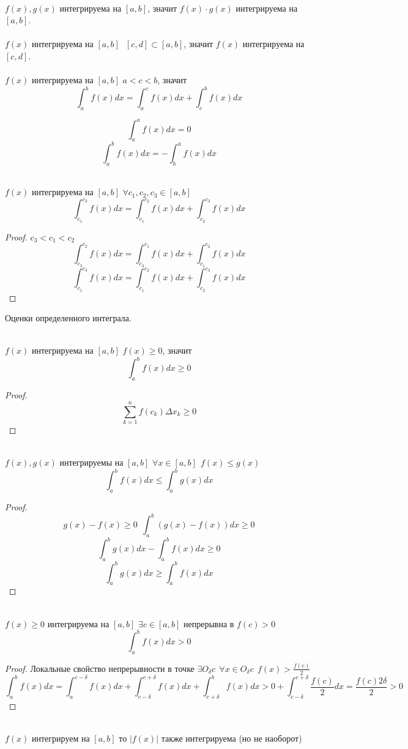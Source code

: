 \\
$f(x),g(x)$ интегрируема на $[a,b]$, значит $f(x) \cdot g(x)$
интегрируема на $[a,b]$.\\
\\
 $f(x)$ интегрируема на $[a,b] ~~~ [c,d] \subset [a,b]$, значит
$f(x)$ интегрируема на $[c,d]$.\\
\\
$f(x)$ интегрируема на $[a,b]$ $a < c < b$, значит
    \[\int_a^b f(x)dx = \int_a^c f(x)dx + \int_c^b f(x)dx\]

\[
    \int_a^a f(x)dx = 0
\]
\[
    \int_a^b f(x)dx = - \int_b^a f(x)dx
\]

\\
$f(x)$ интегрируема на $[a, b]$ $\forall c_1, c_2, c_3 \in [a, b]$
    \[
    \int_{c_1}^{c_3} f(x)dx = \int_{c_1}^{c_2} f(x)dx + \int_{c_2}^{c_3} f(x)dx
    \]

\begin{proof}
  $c_3 < c_1 < c_2$
    \[
        \int_{c_3}^{c_2} f(x)dx = \int_{c_3}^{c_1}f(x)dx +
        \int_{c_1}^{c_2}f(x)dx
    \]
    \[
        \int_{c_1}^{c_3} f(x)dx = \int_{c_1}^{c_2}f(x)dx +
        \int_{c_2}^{c_3}f(x)dx
    \]
\end{proof}

\begin{title}[\Large]
    Оценки определенного интеграла.
\end{title}
\\
$f(x)$ интегрируема на $[a,b]$ $f(x) \ge 0$, значит
\[\int_a^b f(x)dx \ge 0\]
\begin{proof}
    \[\sum_{k=1}^{n} f(c_k)\Delta x_k \ge 0\]
\end{proof}
\\
    $f(x), g(x)$ интегрируемы на $[a, b]$ $\forall x \in [a, b] ~~ f(x)\le g(x)$
    \[\int_a^b f(x)dx \le \int_a^b g(x)dx\]
\begin{proof}
    \[g(x) - f(x) \ge 0 ~~ \int_a^b (g(x) - f(x))dx \ge 0\]
    \[\int_a^b g(x)dx - \int_a^b f(x)dx \ge 0\]
    \[\int_a^b g(x)dx \ge \int_a^b f(x)dx \]
\end{proof}

\\
$f(x) \ge 0$ интегрируема на $[a, b]$ $\exists c \in [a, b]$ непрерывна
в $f(c) > 0$ \[\int_a^b f(x)dx > 0\]
\begin{proof}
    Локальные свойство непрерывности в точке $\exists O_{\delta}c ~~
    \forall x \in O_{\delta}c ~~ f(x) > \frac{f(c)}{2}$
    \[
        \int_a^b f(x)dx = \int_a^{c-\delta} f(x)dx +
        \int_{c-\delta}^{c+\delta} f(x)dx + \int_{c+\delta}^b f(x)dx >
        0 + \int_{c-\delta}^{c+\delta} \frac{f(c)}{2}dx
        = \frac{f(c) 2\delta}{2} > 0
    \]
\end{proof}
\\
$f(x)$ интегрируем на $[a, b]$ то $|f(x)|$ также интегрируема
(но не наоборот)

